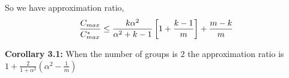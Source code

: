 \documentclass[10pt, conference, compsocconf]{IEEEtran}
\begin{document}
 
 So we have approximation ratio,\\
 \begin{equation}{\nonumber}
\frac{C_{max}}{C_{max}^{*}} \leq \frac{k\alpha^{2}}{\alpha^{2}+k-1}\left[1+ {\frac{k-1}{m}} \right]+ {\frac{m-k}{m}} \end{equation}



\textbf{Corollary 3.1:} When the number of groups is $2$ the approximation ratio is $ 1+ \frac{2}{1+\alpha^{2}} (\alpha^2-\frac{1}{m})  $ \\







%
%



%
%
\end{document}
